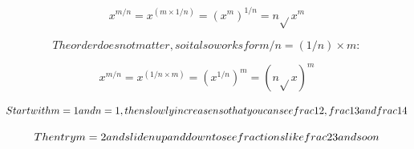 \[x^{m/n} = x^{(m \times 1/n)} = (x^{m})^{1/n} = n\sqrt{}x^{m}\]

\[The order does not matter, so it also works for m/n = (1/n) \times m:\]

\[x^{m/n} = x^{(1/n \times m)} = (x^{1/n})^{m} = (n\sqrt{}x )^{m}\]

\[Start with m=1 and n=1, then slowly increase n so that you can see \\frac{1}{2}, \\frac{1}{3} and \\frac{1}{4}\]

\[Then try m=2 and slide n up and down to see fractions like \\frac{2}{3} and so on\]
